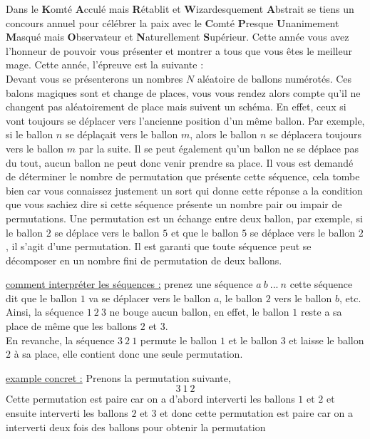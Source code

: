 \problemname{\problemyamlname}


Dans le \textbf{K}omté \textbf{A}cculé mais \textbf{R}établit et \textbf{W}izardesquement \textbf{A}bstrait se tiens un concours annuel pour célébrer la paix avec le \textbf{C}omté \textbf{P}resque \textbf{U}nanimement \textbf{M}asqué mais \textbf{O}bservateur et \textbf{N}aturellement \textbf{S}upérieur.
Cette année vous avez l'honneur de pouvoir vous présenter et montrer a tous que vous êtes le meilleur mage. Cette année, l'épreuve est la suivante : \\

Devant vous se présenterons un nombres $N$ aléatoire de ballons numérotés. Ces balons magiques sont et change de places, vous vous rendez alors compte qu'il ne changent pas aléatoirement de place mais suivent un schéma. En effet, ceux si vont toujours se déplacer vers l'ancienne position d'un même ballon.
Par exemple, si le ballon $n$ se déplaçait vers le ballon $m$, alors le ballon $n$ se déplacera toujours vers le ballon $m$ par la suite. Il se peut également qu'un ballon ne se déplace pas du tout, aucun ballon ne peut donc venir prendre sa place.
Il vous est demandé de déterminer le nombre de permutation que présente cette séquence, cela tombe bien car vous connaissez justement un sort qui donne cette réponse a la condition que vous sachiez dire si cette séquence présente un nombre pair ou impair de permutations.
Une permutation est un échange entre deux ballon, par exemple, si le ballon $2$ se déplace vers le ballon $5$ et que le ballon $5$ se déplace vers le ballon $2$, il s'agit d'une permutation.
Il est garanti que toute séquence peut se décomposer en un nombre fini de permutation de deux ballons.

\underline{comment interpréter les séquences :} prenez une séquence $a\ b\ ...\ n$ cette séquence dit que le ballon $1$ va se déplacer vers le ballon $a$, le ballon $2$ vers le ballon $b$, etc.\\
Ainsi, la séquence $1\ 2\ 3$ ne bouge aucun ballon, en effet, le ballon $1$ reste a sa place de même que les ballons $2$ et $3$.\\
En revanche, la séquence $3\ 2\ 1$ permute le ballon $1$ et le ballon $3$ et laisse le ballon $2$ à sa place, elle contient donc une seule permutation.

\underline{example concret :} Prenons la permutation suivante,
\[
3\ 1\ 2    
\]
Cette permutation est paire car on a d'abord interverti les ballons $1$ et $2$ et ensuite interverti les ballons $2$ et $3$ et donc cette permutation est paire car on a interverti deux fois des ballons pour obtenir la permutation

